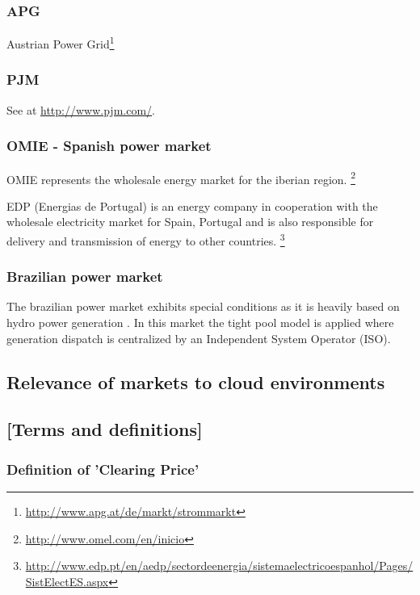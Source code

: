 \subsubsection{APG}

Austrian Power Grid\footnote{\url{http://www.apg.at/de/markt/strommarkt}}



\subsubsection{PJM}

See at \url{http://www.pjm.com/}. 


\subsubsection{OMIE - Spanish power market}

OMIE represents the wholesale energy market for the iberian region. \footnote{\url{http://www.omel.com/en/inicio}}

EDP (Energias de Portugal) is an energy company in cooperation with the wholesale electricity market for Spain, Portugal and is also responsible for delivery and transmission of energy to other countries. \footnote{\url{http://www.edp.pt/en/aedp/sectordeenergia/sistemaelectricoespanhol/Pages/SistElectES.aspx}}


\subsubsection{Brazilian power market}

The brazilian power market exhibits special conditions as it is heavily based on hydro power generation \cite{reston2012short}. In this market the tight pool model is applied where generation dispatch is centralized by an Independent System Operator (ISO). 



\subsection{Relevance of markets to cloud environments}


\subsection{[Terms and definitions]}

\subsubsection{Definition of 'Clearing Price'}

